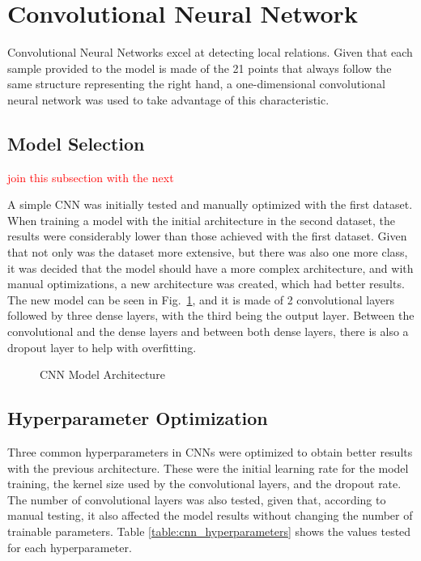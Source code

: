 \section{Convolutional Neural Network}

Convolutional Neural Networks excel at detecting local relations. Given that each sample provided to the model is made of the 21 points that always follow the same structure representing the right hand, a one-dimensional convolutional neural network was used to take advantage of this characteristic.

\subsection{Model Selection}

\textcolor{red}{join this subsection with the next}

A simple CNN was initially tested and manually optimized with the first dataset. When training a model with the initial architecture in the second dataset, the results were considerably lower than those achieved with the first dataset. Given that not only was the dataset more extensive, but there was also one more class, it was decided that the model should have a more complex architecture, and with manual optimizations, a new architecture was created, which had better results. The new model can be seen in Fig.~\ref{fig:cnn_architecture}, and it is made of 2 convolutional layers followed by three dense layers, with the third being the output layer. Between the convolutional and the dense layers and between both dense layers, there is also a dropout layer to help with overfitting.

\begin{figure}[H]
    \centering
    {\fontsize{10}{12}\selectfont}
    \caption[CNN Model Architecture]{CNN Model Architecture}
    \label{fig:cnn_architecture}
\end{figure}

\subsection{Hyperparameter Optimization}

Three common hyperparameters in CNNs were optimized to obtain better results with the previous architecture. These were the initial learning rate for the model training, the kernel size used by the convolutional layers, and the dropout rate. The number of convolutional layers was also tested, given that, according to manual testing, it also affected the model results without changing the number of trainable parameters. Table \ref{table:cnn_hyperparameters} shows the values tested for each hyperparameter.

